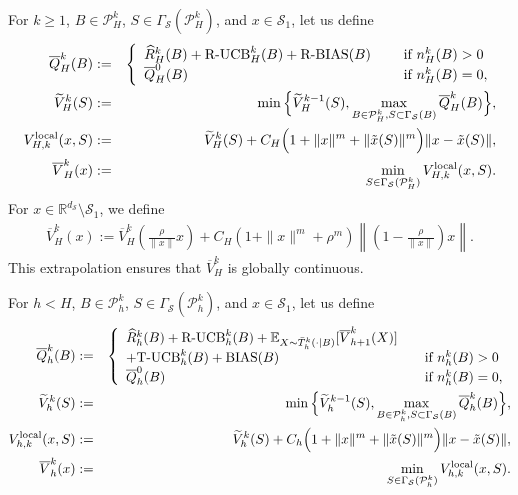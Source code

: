 \documentclass[final,supplement]{siamart251216}
\begin{document}
For $k\ge1$, $B\in\mathcal P_H^k$, $S\in\Gamma_{\mathcal S}(\mathcal P_H^k)$, and $x\in\mathcal S_1$, let us define
\begin{eqnarray}\label{eq:Q,V estimation for h=H}
     \overline{Q}_{H}^{k}(B) &:=&\left\{\begin{array}{lll}\widehat{R}_{H}^{k}(B)+\mbox{\rm R-UCB}_{H}^{k}(B)+\mbox{\rm R-BIAS}(B) && \mbox{ if } n_H^k(B)>0\\
     \overline{Q}_{H}^{0}(B) &&
       \mbox{ if } n_H^k(B)=0, 
       \end{array}\right. \nonumber\\ 
        \widetilde{V}_{H}^{k}(S)&:=&\min\Big\{\widetilde{V}_{H}^{k-1}(S), \max_{B \in \mathcal{P}_H^k,S \subset\Gamma_{\mathcal{S}}(B) }\overline{Q}_{H}^{k}(B)\Big\} ,\nonumber\\ 
         V_{H,k}^{\rm local}(x, S)&:=& \widetilde{V}_{H}^{k}(S)+C_{H}\Big(1+\|x\|^m+\|\tilde{x}(S)\|^m\Big)\|x-\tilde{x}(S)\|, \nonumber\\ 
        \overline{V}_{H}^{k}(x)&:=&\min_{S \in \Gamma_{\mathcal{S}}(\mathcal{P}_H^k)} V_{H,k}^{\rm local}(x, S).
\end{eqnarray}
For $x \in \mathbb{R}^{d_{\mathcal{S}}}\setminus\mathcal{S}_{1}$, we define 
\begin{eqnarray}\label{eq:Q,V estimation for h=H outside}
    \overline{V}_{H}^{k}(x):=\overline{V}_{H}^{k}\left(\frac{\rho}{\|x\|}x\right)+C_{H}(1+\|x\|^{m}+\rho^{m})\left\|\left(1-\frac{\rho}{\|x\|}\right)x\right\|. 
\end{eqnarray}
This extrapolation ensures that $\overline V_H^k$ is globally continuous.


For $h<H$, $B\in\mathcal P_h^k$, $S\in\Gamma_{\mathcal S}(\mathcal P_h^k)$, and $x\in\mathcal S_1$, let us define
\begin{eqnarray}\label{V-estimate}
    \overline{Q}_{h}^{k}(B) &:=&\left\{\begin{array}{lll}\widehat{R}_{h}^{k}(B)+\mbox{\rm R-UCB}_{h}^{k}(B)+\mathbb{E}_{X \sim \bar{T}_{h}^{k}(\cdot|B)}[\overline{V}_{h+1}^{k}(X)]\nonumber\\
    +\mbox{\rm T-UCB}_{h}^{k}(B)+{\rm BIAS}(B) &&\mbox{if } n_h^k(B)>0 \nonumber\\
     \overline{Q}_{h}^{0}(B) &&
       \mbox{if } n_h^k(B)=0,
       \end{array}\right. \nonumber\\ 
    \widetilde{V}_{h}^{k}(S)&:=&\min\Big\{\widetilde{V}_{h}^{k-1}(S), \max_{B \in \mathcal{P}_h^k,S \subset\Gamma_{\mathcal{S}}(B)}\overline{Q}_{h}^{k}(B)\Big\},\nonumber\\
     V_{h,k}^{\rm local}(x, S)&:=& \widetilde{V}_{h}^{k}(S)+C_{h}\Big(1+\|x\|^m+\|\tilde{x}(S)\|^m\Big)\|x-\tilde{x}(S)\|  , \nonumber\\
  \overline{V}_{h}^{k}(x)&:=&\min_{S \in \Gamma_{\mathcal{S}}(\mathcal{P}_h^k)}
     V_{h,k}^{\rm local}(x,S).
\end{eqnarray}
\end{document}
